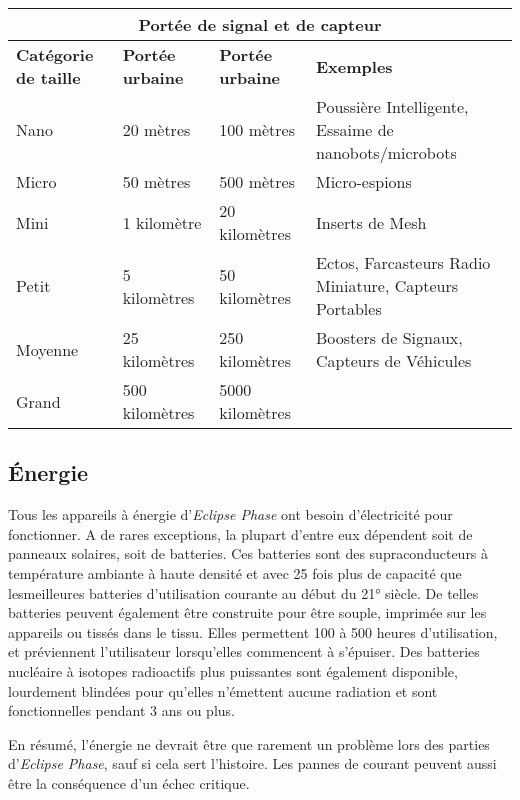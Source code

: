 \begin{table} \begin{tabularx}{\textwidth}{|l|l|l|X|} \hline

\multicolumn{4}{|c|}{\textbf{Portée de signal et de capteur}}	\\ \hline

\textbf{Catégorie de taille}	&\textbf{Portée urbaine}	&\textbf{Portée urbaine}	&\textbf{Exemples} \\ \hline

Nano &20 mètres &100 mètres	&Poussière Intelligente, Essaime de nanobots/microbots \\ Micro	&50 mètres	&500 mètres	&Micro-espions \\ Mini	&1 kilomètre	&20 kilomètres	&Inserts de Mesh\\ Petit	&5 kilomètres	&50 kilomètres	&Ectos, Farcasteurs Radio Miniature, Capteurs Portables \\ Moyenne	&25 kilomètres	&250 kilomètres	&Boosters de Signaux, Capteurs de Véhicules \\ Grand	&500 kilomètres	&5000 kilomètres	&\\ \hline

\end{tabularx} \label{tab:radio-sensor-ranges} \end{table} 



\subsection{Énergie} \label{sec:power} 

Tous les appareils à énergie d'\emph{Eclipse Phase} ont besoin d'électricité pour fonctionner. A de rares exceptions, la plupart d'entre eux dépendent soit de panneaux solaires, soit de batteries. Ces batteries sont des supraconducteurs à température ambiante à haute densité et avec 25 fois plus de capacité que lesmeilleures batteries d'utilisation courante au début du 21° siècle. De telles batteries peuvent également être construite pour être souple, imprimée sur les appareils ou tissés dans le tissu. Elles permettent 100 à 500 heures d'utilisation, et préviennent l'utilisateur lorsqu'elles commencent à s'épuiser. Des batteries nucléaire à isotopes radioactifs plus puissantes sont également disponible, lourdement blindées pour qu'elles n'émettent aucune radiation et sont fonctionnelles pendant 3 ans ou plus. 

En résumé, l'énergie ne devrait être que rarement un problème lors des parties d'\emph{Eclipse Phase}, sauf si cela sert l'histoire. Les pannes de courant peuvent aussi être la conséquence d'un échec critique. 



